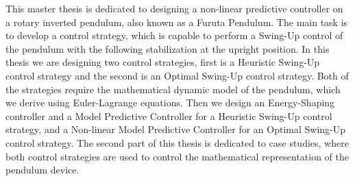 This master thesis is dedicated to designing a non-linear predictive controller on a rotary inverted pendulum, also known as a Furuta Pendulum. The main task is to develop a control strategy, which is capable to perform a Swing-Up control of the pendulum with the following stabilization at the upright position. In this thesis we are designing two control strategies, first is a Heuristic Swing-Up control strategy and the second is an Optimal Swing-Up control strategy. Both of the strategies require the mathematical dynamic model of the pendulum, which we derive using Euler-Lagrange equations. Then we design an Energy-Shaping controller and a Model Predictive Controller for a Heuristic Swing-Up control strategy, and a Non-linear Model Predictive Controller for an Optimal Swing-Up control strategy. The second part of this thesis is dedicated to case studies, where both control strategies are used to control the mathematical representation of the pendulum device.
